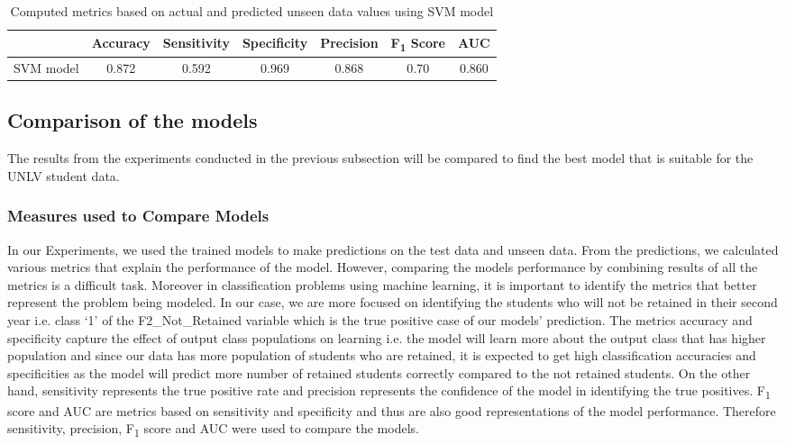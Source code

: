 \documentclass[11pt,openright]{report}
\begin{document}
\begin{table}[!htb]
	\renewcommand{\arraystretch}{1.3}
	\caption{Computed metrics based on actual and predicted unseen data values using SVM model}
	\label{table:SVM-unseen_metrics_db}
	\centering
	\begin{tabular}{|c|c|c|c|c|c|c|}
    \hline
  	 & \bfseries Accuracy & \bfseries Sensitivity & \bfseries Specificity & \bfseries Precision & \bfseries F\textsubscript{1} Score  & \bfseries AUC\\  
    \hline
	SVM model & 0.872 & 0.592 & 0.969 & 0.868 & 0.70 & 0.860 \\ \hline
	\end{tabular} 
\end{table}


\subsection {Comparison of the models}

The results from the experiments conducted in the previous subsection will be compared to find the best model that is suitable for the UNLV student data. 

\subsubsection {Measures used to Compare Models}

In our Experiments, we used the trained models to make predictions on the test data and unseen data. From the predictions, we calculated various metrics that explain the performance of the model. However, comparing the models performance by combining results of all the metrics is a difficult task. Moreover in classification problems using machine learning, it is important to identify the metrics that better represent the problem being modeled. In our case, we are more focused on identifying the students who will not be retained in their second year i.e. class `1' of the F2\_Not\_Retained variable which is the true positive case of our models' prediction. The metrics accuracy and specificity capture the effect of output class populations on learning i.e. the model will learn more about the output class that has higher population and since our data has more population of students who are retained, it is expected to get high classification accuracies and specificities as the model will predict more number of retained students correctly compared to the not retained students. On the other hand, sensitivity represents the true positive rate and precision represents the confidence of the model in identifying the true positives. F\textsubscript{1} score and AUC are metrics based on sensitivity and specificity and thus are also good representations of the model performance. Therefore sensitivity, precision, F\textsubscript{1} score and AUC were used to compare the models.
\end{document}
